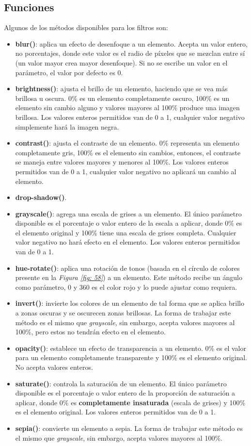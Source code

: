 \subsection{Funciones}

Algunos de los métodos disponibles para los filtros son:
\begin{itemize}
    \item \textbf{blur()}: aplica un efecto de desenfoque a un elemento. Acepta un valor entero, no porcentajes, donde este valor es el radio de píxeles que se mezclan entre sí (un valor mayor crea mayor desenfoque). Si no se escribe un valor en el parámetro, el valor por defecto es 0.
    \item \textbf{brightness()}: ajusta el brillo de un elemento, haciendo que se vea más brillosa u oscura. 0\% es un elemento completamente oscuro, 100\% es un elemento sin cambio alguno y valores mayores al 100\% produce una imagen brillosa. Los valores enteros permitidos van de 0 a 1, cualquier valor negativo simplemente hará la imagen negra.
    \item \textbf{contrast()}: ajusta el contraste de un elemento. 0\% representa un elemento completamente gris, 100\% es el elemento sin cambios, entonces, el contraste se maneja entre valores mayores y menores al 100\%. Los valores enteros permitidos van de 0 a 1, cualquier valor negativo no aplicará un cambio al elemento.
    \item \textbf{drop-shadow()}.
    \item \textbf{grayscale()}: agrega una escala de grises a un elemento. El único parámetro disponible es el porcentaje o valor entero de la escala a aplicar, donde 0\% es el elemento original y 100\% tiene una escala de grises completa. Cualquier valor negativo no hará efecto en el elemento. Los valores enteros permitidos van de 0 a 1.
    \item \textbf{hue-rotate()}: aplica una rotación de tonos (basada en el círculo de colores presente en la \textit{Figura \ref{fig: 58}}) a un elemento. Este método recibe un ángulo como parámetro, 0 y 360 es el color rojo y lo puede ajustar como requiera.
    \item \textbf{invert()}: invierte los colores de un elemento de tal forma que se aplica brillo a zonas oscuras y se oscurecen zonas brillosas. La forma de trabajar este método es el mismo que \textit{grayscale}, sin embargo, acepta valores mayores al 100\%, pero estos no tendrán efecto en el elemento.
    \item \textbf{opacity()}: establece un efecto de transparencia a un elemento. 0\% es el valor para un elemento completamente transparente y 100\% es el elemento original. No acepta valores enteros.
    \item \textbf{saturate()}: controla la saturación de un elemento. El único parámetro disponible es el porcentaje o valor entero de la proporción de saturación a aplicar, donde 0\% es \textbf{completamente insaturada} (escala de grises) y 100\% es el elemento original. Los valores enteros permitidos van de 0 a 1.
    \item \textbf{sepia()}: convierte un elemento a sepia. La forma de trabajar este método es el mismo que \textit{grayscale}, sin embargo, acepta valores mayores al 100\%.
\end{itemize}
